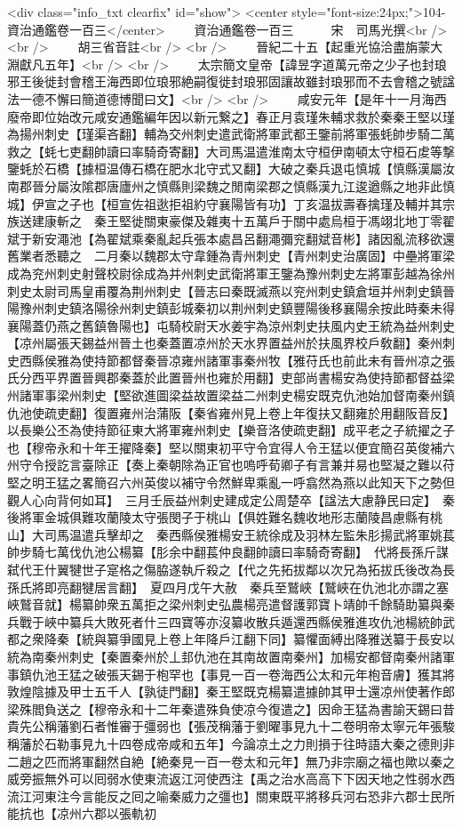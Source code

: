 <div class="info_txt clearfix" id="show">
<center style="font-size:24px;">104-資治通鑑卷一百三</center>
  　　資治通鑑卷一百三　　　宋　司馬光撰<br />
<br />
　　胡三省音註<br />
<br />
　　晉紀二十五【起重光協洽盡旃蒙大淵獻凡五年】<br />
<br />
　　太宗簡文皇帝【諱昱字道萬元帝之少子也封琅邪王後徙封會稽王海西即位琅邪絶嗣復徙封琅邪固讓故雖封琅邪而不去會稽之號諡法一德不懈曰簡道德博聞曰文】<br />
<br />
　　咸安元年【是年十一月海西廢帝即位始改元咸安通鑑編年因以新元繋之】春正月袁瑾朱輔求救於秦秦王堅以瑾為揚州刺史【瑾渠吝翻】輔為交州刺史遣武衛將軍武都王鑒前將軍張蚝帥步騎二萬救之【蚝七吏翻帥讀曰率騎奇寄翻】大司馬温遣淮南太守桓伊南頓太守桓石䖍等撃鑒蚝於石橋【據桓温傳石橋在肥水北守式又翻】大破之秦兵退屯慎城【慎縣漢屬汝南郡晉分屬汝隂郡唐廬州之慎縣則梁魏之閒南梁郡之慎縣漢九江逡遒縣之地非此慎城】伊宣之子也【桓宣佐祖逖拒祖約守襄陽皆有功】丁亥温拔壽春擒瑾及輔并其宗族送建康斬之　秦王堅徙關東豪傑及雜夷十五萬戶于關中處烏桓于馮翊北地丁零翟斌于新安澠池【為翟斌乘秦亂起兵張本處昌呂翻澠彌兖翻斌音彬】諸因亂流移欲還舊業者悉聽之　二月秦以魏郡太守韋鍾為青州刺史【青州刺史治廣固】中壘將軍梁成為兖州刺史射聲校尉徐成為并州刺史武衛將軍王鑒為豫州刺史左將軍彭越為徐州刺史太尉司馬皇甫覆為荆州刺史【晉志曰秦既滅燕以兖州刺史鎮倉垣并州刺史鎮晉陽豫州刺史鎮洛陽徐州刺史鎮彭城秦初以荆州刺史鎮豐陽後移襄陽余按此時秦未得襄陽蓋仍燕之舊鎮魯陽也】屯騎校尉天水姜宇為涼州刺史扶風内史王統為益州刺史【凉州屬張天錫益州晉土也秦蓋置凉州於天水界置益州於扶風界校戶敎翻】秦州刺史西縣侯雅為使持節都督秦晉凉雍州諸軍事秦州牧【雅苻氏也前此未有晉州凉之張氏分西平界置晉興郡秦蓋於此置晉州也雍於用翻】吏部尚書楊安為使持節都督益梁州諸軍事梁州刺史【堅欲進圖梁益故置梁益二州刺史楊安既克仇池始加督南秦州鎮仇池使疏吏翻】復置雍州治蒲阪【秦省雍州見上卷上年復扶又翻雍於用翻阪音反】以長樂公丕為使持節征東大將軍雍州刺史【樂音洛使疏吏翻】成平老之子統擢之子也【穆帝永和十年王擢降秦】堅以關東初平守令宜得人令王猛以便宜簡召英俊補六州守令授訖言臺除正【奏上秦朝除為正官也嗚呼荀卿子有言兼并易也堅凝之難以苻堅之明王猛之畧簡召六州英俊以補守令然鮮卑乘亂一呼翕然為燕以此知天下之勢但觀人心向背何如耳】　三月壬辰益州刺史建成定公周楚卒【諡法大慮静民曰定】　秦後將軍金城俱難攻蘭陵太守張閔子于桃山【俱姓難名魏收地形志蘭陵昌慮縣有桃山】大司馬温遣兵擊却之　秦西縣侯雅楊安王統徐成及羽林左監朱肜揚武將軍姚萇帥步騎七萬伐仇池公楊纂【肜余中翻萇仲良翻帥讀曰率騎奇寄翻】　代將長孫斤謀弑代王什翼犍世子寔格之傷脇遂執斤殺之【代之先拓拔鄰以次兄為拓拔氏後改為長孫氏將即亮翻犍居言翻】　夏四月戊午大赦　秦兵至鷲峽【鷲峽在仇池北亦謂之塞峽鷲音就】楊纂帥衆五萬拒之梁州刺史弘農楊亮遣督護郭寶卜靖帥千餘騎助纂與秦兵戰于峽中纂兵大敗死者什三四寶等亦沒纂收散兵遁還西縣侯雅進攻仇池楊統帥武都之衆降秦【統與纂爭國見上卷上年降戶江翻下同】纂懼面縛出降雅送纂于長安以統為南秦州刺史【秦置秦州於丄邽仇池在其南故置南秦州】加楊安都督南秦州諸軍事鎮仇池王猛之破張天錫于枹罕也【事見一百一卷海西公太和元年枹音膚】獲其將敦煌陰據及甲士五千人【孰徒門翻】秦王堅既克楊纂遣據帥其甲士還凉州使著作郎梁殊閻負送之【穆帝永和十二年秦遣殊負使凉今復遣之】因命王猛為書諭天錫曰昔貴先公稱藩劉石者惟審于彊弱也【張茂稱藩于劉曜事見九十二卷明帝太寧元年張駿稱藩於石勒事見九十四卷成帝咸和五年】今論凉土之力則損于往時語大秦之德則非二趙之匹而將軍翻然自絶【絶秦見一百一卷太和元年】無乃非宗廟之福也歟以秦之威旁振無外可以囘弱水使東流返江河使西注【禹之治水高高下下因天地之性弱水西流江河東注今言能反之囘之喻秦威力之彊也】關東既平將移兵河右恐非六郡士民所能抗也【凉州六郡以張軌初